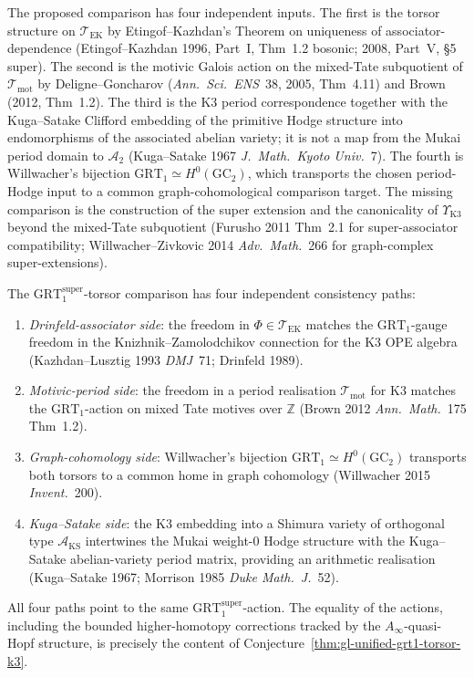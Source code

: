 \begin{remark}
\label{rem:gl-unified-grt1-torsor-evidence}
The proposed comparison has four independent inputs. The first is the
torsor structure on $\mathcal{T}_{\mathrm{EK}}$ by
Etingof--Kazhdan's Theorem on uniqueness of associator-dependence
(Etingof--Kazhdan 1996, Part~I, Thm~1.2 bosonic; 2008, Part~V, \S5
super). The second is the motivic Galois action on the mixed-Tate
subquotient of $\mathcal{T}_{\mathrm{mot}}$ by Deligne--Goncharov
(\emph{Ann.\ Sci.\ ENS}~38, 2005, Thm~4.11) and Brown (2012, Thm~1.2).
The third is the K3 period correspondence together with the
Kuga--Satake Clifford embedding of the primitive Hodge structure into
endomorphisms of the associated abelian variety; it is not a map from
the Mukai period domain to \(\mathcal A_2\)
\textup{(}Kuga--Satake 1967 \emph{J.\ Math.\ Kyoto Univ.}~7\textup{)}.
The fourth is Willwacher's bijection
$\mathrm{GRT}_1 \simeq H^0(\mathrm{GC}_2)$, which transports the chosen
period-Hodge input to a common graph-cohomological comparison target. The
missing comparison is the construction of the super extension and the
canonicality of $\Upsilon_{\mathrm{K3}}$ beyond the mixed-Tate subquotient
(Furusho 2011 Thm~2.1 for super-associator compatibility;
Willwacher--Zivkovic 2014 \emph{Adv.\ Math.}~266 for graph-complex
super-extensions).
\end{remark}

\begin{remark}
\label{rem:gl-grt1-four-paths}
The $\mathrm{GRT}_1^{\mathrm{super}}$-torsor comparison has four independent
consistency paths:
\begin{enumerate}[label=(\roman*)]
 \item \emph{Drinfeld-associator side}: the freedom in $\Phi \in
 \mathcal{T}_{\mathrm{EK}}$ matches the $\mathrm{GRT}_1$-gauge
 freedom in the Knizhnik--Zamolodchikov connection for the
 K3 OPE algebra (Kazhdan--Lusztig 1993 \emph{DMJ}~71; Drinfeld 1989).
 \item \emph{Motivic-period side}: the freedom in a period
 realisation $\mathcal{T}_{\mathrm{mot}}$ for K3 matches the
 $\mathrm{GRT}_1$-action on mixed Tate motives over $\mathbb{Z}$
 (Brown 2012 \emph{Ann.\ Math.}~175 Thm~1.2).
 \item \emph{Graph-cohomology side}: Willwacher's bijection
 $\mathrm{GRT}_1 \simeq H^0(\mathrm{GC}_2)$ transports both
 torsors to a common home in graph cohomology (Willwacher 2015
 \emph{Invent.}~200).
 \item \emph{Kuga--Satake side}: the K3 embedding into a Shimura
 variety of orthogonal type $\mathcal{A}_{\mathrm{KS}}$
 intertwines the Mukai weight-$0$ Hodge structure with the
 Kuga--Satake abelian-variety period matrix, providing an
 arithmetic realisation (Kuga--Satake 1967; Morrison 1985
 \emph{Duke Math.\ J.}~52).
\end{enumerate}
All four paths point to the same $\mathrm{GRT}_1^{\mathrm{super}}$-action.
The equality of the actions, including the bounded higher-homotopy corrections
tracked by the $A_\infty$-quasi-Hopf structure, is precisely the content of
Conjecture~\ref{thm:gl-unified-grt1-torsor-k3}.
\end{remark}

